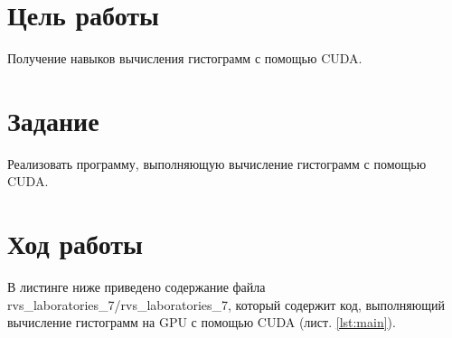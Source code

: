\documentclass[14pt]{extarticle}
\makeatletter
\newcommand{\numbersections}{\renewcommand{\Hy@numberline}[1]{##1~}}
\let\oldsection\section
\renewcommand{\section}{\numbersections\oldsection}
\makeatother
\begin{document}
\section{Цель работы}

Получение навыков вычисления гистограмм с помощью CUDA.

\section{Задание}

Реализовать программу, выполняющую вычисление гистограмм с помощью CUDA.

\section{Ход работы}

В листинге ниже приведено содержание файла rvs\_laboratories\_7/rvs\_laboratories\_7, который содержит код, выполняющий вычисление гистограмм на GPU с помощью CUDA (лист. \ref{lst:main}).
\end{document}
